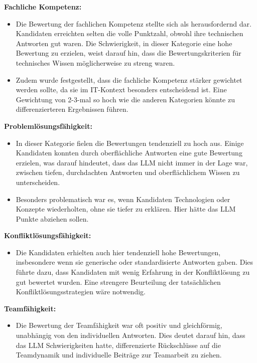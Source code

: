 \textbf{Fachliche Kompetenz:}

\begin{itemize}
    \item Die Bewertung der fachlichen Kompetenz stellte sich als herausfordernd dar. Kandidaten erreichten selten die volle Punktzahl, obwohl ihre technischen Antworten gut waren. Die Schwierigkeit, in dieser Kategorie eine hohe Bewertung zu erzielen, weist darauf hin, dass die Bewertungskriterien für technisches Wissen möglicherweise zu streng waren.
    \item Zudem wurde festgestellt, dass die fachliche Kompetenz stärker gewichtet werden sollte, da sie im IT-Kontext besonders entscheidend ist. Eine Gewichtung von 2-3-mal so hoch wie die anderen Kategorien könnte zu differenzierteren Ergebnissen führen.
\end{itemize}

\textbf{Problemlösungsfähigkeit:}

\begin{itemize}
    \item In dieser Kategorie fielen die Bewertungen tendenziell zu hoch aus. Einige Kandidaten konnten durch oberflächliche Antworten eine gute Bewertung erzielen, was darauf hindeutet, dass das LLM nicht immer in der Lage war, zwischen tiefen, durchdachten Antworten und oberflächlichem Wissen zu unterscheiden.
    \item Besonders problematisch war es, wenn Kandidaten Technologien oder Konzepte wiederholten, ohne sie tiefer zu erklären. Hier hätte das LLM Punkte abziehen sollen.
\end{itemize}

\textbf{Konfliktlösungsfähigkeit:}

\begin{itemize}
    \item Die Kandidaten erhielten auch hier tendenziell hohe Bewertungen, insbesondere wenn sie generische oder standardisierte Antworten gaben. Dies führte dazu, dass Kandidaten mit wenig Erfahrung in der Konfliktlösung zu gut bewertet wurden. Eine strengere Beurteilung der tatsächlichen Konfliktlösungsstrategien wäre notwendig.
\end{itemize}

\textbf{Teamfähigkeit:}

\begin{itemize}
    \item Die Bewertung der Teamfähigkeit war oft positiv und gleichförmig, unabhängig von den individuellen Antworten. Dies deutet darauf hin, dass das LLM Schwierigkeiten hatte, differenzierte Rückschlüsse auf die Teamdynamik und individuelle Beiträge zur Teamarbeit zu ziehen.
\end{itemize}

